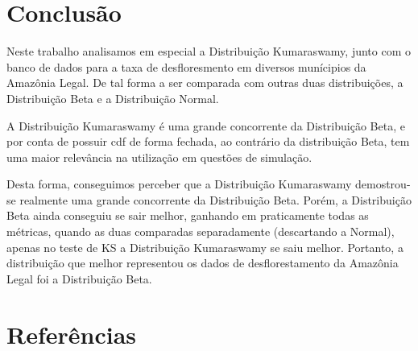 \documentclass[
]{article}
\begin{document}
\section{\centering Conclusão}

Neste trabalho analisamos em especial a Distribuição Kumaraswamy, junto
com o banco de dados para a taxa de desfloresmento em diversos
munícipios da Amazônia Legal. De tal forma a ser comparada com outras
duas distribuições, a Distribuição Beta e a Distribuição Normal.

A Distribuição Kumaraswamy é uma grande concorrente da Distribuição
Beta, e por conta de possuir cdf de forma fechada, ao contrário da
distribuição Beta, tem uma maior relevância na utilização em questões de
simulação.

Desta forma, conseguimos perceber que a Distribuição Kumaraswamy
demostrou-se realmente uma grande concorrente da Distribuição Beta.
Porém, a Distribuição Beta ainda conseguiu se sair melhor, ganhando em
praticamente todas as métricas, quando as duas comparadas separadamente
(descartando a Normal), apenas no teste de KS a Distribuição Kumaraswamy
se saiu melhor. Portanto, a distribuição que melhor representou os dados
de desflorestamento da Amazônia Legal foi a Distribuição Beta.

\section{\centering Referências}
\end{document}
